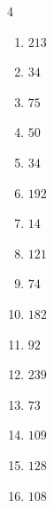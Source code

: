 \begin{multicols}{4}
\begin{enumerate}
  \item $213$


  \item $34$


  \item $75$


  \item $50$


  \item $34$


  \item $192$


  \item $14$


  \item $121$


  \item $74$


  \item $182$


  \item $92$


  \item $239$


  \item $73$


  \item $109$


\columnbreak %

  \item $128$


  \item $108$


\end{enumerate}
\end{multicols}
